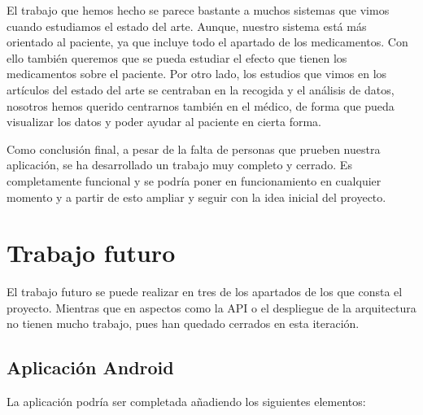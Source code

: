 \documentclass[11pt,spanish]{article}
\begin{document}
El trabajo que hemos hecho se parece bastante a muchos sistemas que vimos cuando estudiamos el estado del arte. Aunque, nuestro sistema está más orientado al paciente, ya que incluye todo el apartado de los medicamentos. Con ello también queremos que se pueda estudiar el efecto que tienen los medicamentos sobre el paciente. Por otro lado, los estudios que vimos en los artículos del estado del arte se centraban en la recogida y el análisis de datos, nosotros hemos querido centrarnos también en el médico, de forma que pueda visualizar los datos y poder ayudar al paciente en cierta forma.
\newline

Como conclusión final, a pesar de la falta de personas que prueben nuestra aplicación, se ha desarrollado un trabajo muy completo y cerrado. Es completamente funcional y se podría poner en funcionamiento en cualquier momento y a partir de esto ampliar y seguir con la idea inicial del proyecto.
\newpage

\section{Trabajo futuro}
El trabajo futuro se puede realizar en tres de los apartados de los que consta el proyecto. Mientras que en aspectos como la API o el despliegue de la arquitectura no tienen mucho trabajo, pues han quedado cerrados en esta iteración.

\subsection{Aplicación Android}
La aplicación podría ser completada añadiendo los siguientes elementos:
\end{document}
